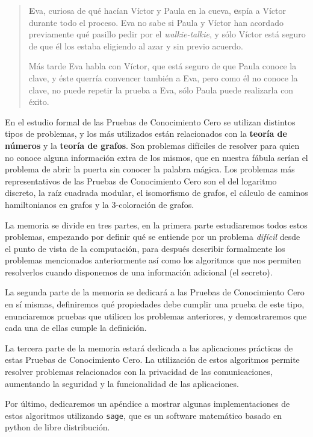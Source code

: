 \begin{quote}
\textbf{E}va, curiosa de qué hacían Víctor y Paula en la cueva, \textbf{e}spía a Víctor durante todo el proceso. Eva no sabe si Paula y Víctor han acordado previamente qué pasillo pedir por el \textit{walkie-talkie}, y sólo Víctor está seguro de que él los estaba eligiendo al azar y sin previo acuerdo.%

Más tarde Eva habla con Víctor, que está seguro de que Paula conoce la clave, y éste querría convencer también a Eva, pero como él no conoce la clave, no puede repetir la prueba a Eva, sólo Paula puede realizarla con éxito.
\end{quote}


\hfil

En el estudio formal de las Pruebas de Conocimiento Cero se utilizan distintos tipos de problemas, y los más utilizados est\'an relacionados con la \textbf{teor\'ia de n\'umeros}
y la \textbf{teor\'ia de grafos}. Son problemas difíciles de resolver para quien no conoce alguna información extra de los mismos, que en nuestra fábula serían el problema de abrir la puerta sin conocer la
palabra mágica. Los problemas más representativos de las Pruebas de Conocimiento Cero son el del logaritmo discreto, la raíz cuadrada modular, el isomorfismo de grafos, el c\'alculo de caminos
hamiltonianos en grafos y la 3-coloración de grafos.

La memoria se divide en tres partes, en la primera parte estudiaremos todos estos problemas, empezando por
definir qué se entiende por un problema \textit{difícil} desde el punto de vista de la computaci\'on, para despu\'es describir formalmente los problemas mencionados anteriormente
as\'i como los algoritmos que nos permiten resolverlos cuando disponemos de una informaci\'on adicional (el secreto).

La segunda parte de la memoria se dedicar\'a a las Pruebas de Conocimiento Cero en s\'i mismas, definiremos qué propiedades debe cumplir una prueba de este tipo,
enunciaremos pruebas que utilicen los problemas anteriores, y demostraremos que cada una de ellas cumple la definición.

La tercera parte de la memoria estar\'a dedicada a las aplicaciones prácticas de estas Pruebas de Conocimiento Cero. La utilizaci\'on de estos algoritmos permite resolver problemas
relacionados con la privacidad de las comunicaciones, aumentando la seguridad y la funcionalidad de las aplicaciones.

Por \'ultimo, dedicaremos un ap\'endice a mostrar algunas implementaciones de estos algoritmos utilizando {\tt sage}, que es un software matem\'atico basado en python de
libre distribuci\'on.

